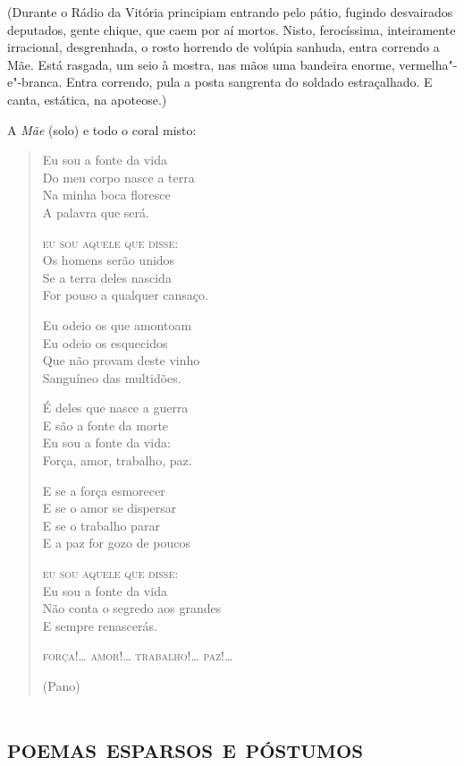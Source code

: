 \hfill\parbox{150pt}{
(Durante o Rádio da Vitória principiam entrando pelo pátio, fugindo
desvairados deputados, gente chique, que caem por aí mortos. Nisto,
ferocíssima, inteiramente irracional, desgrenhada, o rosto horrendo de
volúpia sanhuda, entra correndo a Mãe. Está rasgada, um seio à mostra,
nas mãos uma bandeira enorme, vermelha"-e"-branca. Entra correndo, pula a
posta sangrenta do soldado estraçalhado. E canta, estática, na
apoteose.)
}

A \emph{Mãe} (solo) e todo o coral misto:

\begin{verse}
Eu sou a fonte da vida\\
Do meu corpo nasce a terra\\
Na minha boca floresce\\
A palavra que será.

\textsc{eu sou aquele que disse:}\\
Os homens serão unidos\\
Se a terra deles nascida\\
For pouso a qualquer cansaço.

Eu odeio os que amontoam\\
Eu odeio os esquecidos\\
Que não provam deste vinho\\
Sanguíneo das multidões.

É deles que nasce a guerra\\
E são a fonte da morte\\
Eu sou a fonte da vida:\\
Força, amor, trabalho, paz.

E se a força esmorecer\\
E se o amor se dispersar\\
E se o trabalho parar\\
E a paz for gozo de poucos

\textsc{eu sou aquele que disse}:\\
Eu sou a fonte da vida\\
Não conta o segredo aos grandes\\
E sempre renascerás.

\textsc{força}!\ldots{} \textsc{amor}!\ldots{} \textsc{trabalho}!\ldots{} \textsc{paz}!\ldots{}

\hfill(Pano)
\end{verse}

\part{\textsc{poemas esparsos e póstumos}}

